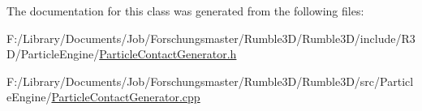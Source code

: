 The documentation for this class was generated from the following files\+:\begin{DoxyCompactItemize}
\item 
F\+:/\+Library/\+Documents/\+Job/\+Forschungsmaster/\+Rumble3\+D/\+Rumble3\+D/include/\+R3\+D/\+Particle\+Engine/\hyperlink{_particle_contact_generator_8h}{Particle\+Contact\+Generator.\+h}\item 
F\+:/\+Library/\+Documents/\+Job/\+Forschungsmaster/\+Rumble3\+D/\+Rumble3\+D/src/\+Particle\+Engine/\hyperlink{_particle_contact_generator_8cpp}{Particle\+Contact\+Generator.\+cpp}\end{DoxyCompactItemize}
